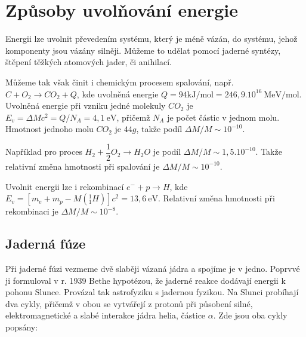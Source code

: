 \documentclass[../../main.tex]{subfiles}
\begin{document}
\section{Způsoby uvolňování energie}

Energii lze uvolnit převedením systému, který je méně vázán, do systému, jehož komponenty jsou vázány silněji. Můžeme to udělat pomocí jaderné syntézy, štěpení těžkých atomových jader, či anihilací.

Můžeme tak však činit i chemickým procesem spalování, např. $C + O_2 \rightarrow CO_2 + Q$, kde uvolněná energie $Q = 94 \mathrm{kJ/mol} = 246,9.10^{16} ~\mathrm{MeV/mol}$. Uvolněná energie při vzniku jedné molekuly $CO_2$ je $E_v = \Delta M c^2 = Q/N_A = 4,1 ~\mathrm{eV}$, přičemž $N_A$ je počet částic v jednom molu. Hmotnost jednoho molu $CO_2$ je $44 g$, takže podíl $\Delta M/M \sim 10^{-10}$. 

Například pro proces $H_2 + \dfrac{1}{2}O_2 \rightarrow H_2 O$ je podíl $\Delta M/M \sim 1,5.10^{-10}$. Takže relativní změna hmotnosti při spalování je $\Delta M/M \sim 10^{-10}$.

Uvolnit energii lze i rekombinací $e^- + p \rightarrow H$, kde $E_v = \left[ m_e + m_p - M\left( ^{1}_{1} H\right) \right] c^2 = 13,6 ~\mathrm{eV}$. Relativní změna hmotnosti při rekombinaci je $\Delta M/M \sim 10^{-8}$. 

\subsection{Jaderná fúze}

Při jaderné fúzi vezmeme dvě slaběji vázaná jádra a spojíme je v jedno. Poprvvé ji formuloval v r. 1939 Bethe hypotézou, že jaderné reakce dodávají energii k pohonu Slunce. Provázal tak astrofyziku s jadernou fyzikou. Na Slunci probíhají dva cykly, přičemž v obou se vytvářejí z protonů při působení silné, elektromagnetické a slabé interakce jádra helia, částice $\alpha$. Zde jsou oba cykly popsány:
\end{document}
